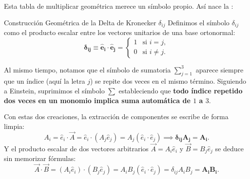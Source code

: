 \documentclass[11pt,letterpaper]{article}
\begin{document}
Esta tabla de multiplicar geométrica merece un símbolo propio. Así nace la :

\begin{theorembox}{Construcción Geométrica de la Delta de Kronecker $\delta_{ij}$}
Definimos el símbolo $\delta_{ij}$ como el producto escalar entre los vectores unitarios de una base ortonormal:
\[
\mathbf{\delta_{ij} \equiv \hat{e}_i \cdot \hat{e}_j} = \begin{cases} 1 & \text{si } i = j, \\ 0 & \text{si } i \neq j. \end{cases}
\]
\end{theorembox}

\begin{center}
\end{center}

Al mismo tiempo, notamos que el símbolo de sumatoria $\sum_{j=1}^3$ aparece siempre que un índice (aquí la letra $j$) se repite dos veces en el mismo término. Siguiendo a Einstein, suprimimos el símbolo $\sum$ estableciendo que \textbf{todo índice repetido dos veces en un monomio implica suma automática de $1$ a $3$}.

Con estas dos creaciones, la extracción de componentes se escribe de forma limpia:
\[
A_i = \hat{e}_i \cdot \vec{A} = \hat{e}_i \cdot (A_j \hat{e}_j) = A_j (\hat{e}_i \cdot \hat{e}_j) \implies \mathbf{\delta_{ij} A_j = A_i}.
\]
Y el producto escalar de dos vectores arbitrarios $\vec{A} = A_i \hat{e}_i$ y $\vec{B} = B_j \hat{e}_j$ se deduce sin memorizar fórmulas:
\[
\vec{A} \cdot \vec{B} = (A_i \hat{e}_i) \cdot (B_j \hat{e}_j) = A_i B_j (\hat{e}_i \cdot \hat{e}_j) = \delta_{ij} A_i B_j = \mathbf{A_i B_i}.
\]
\end{document}

